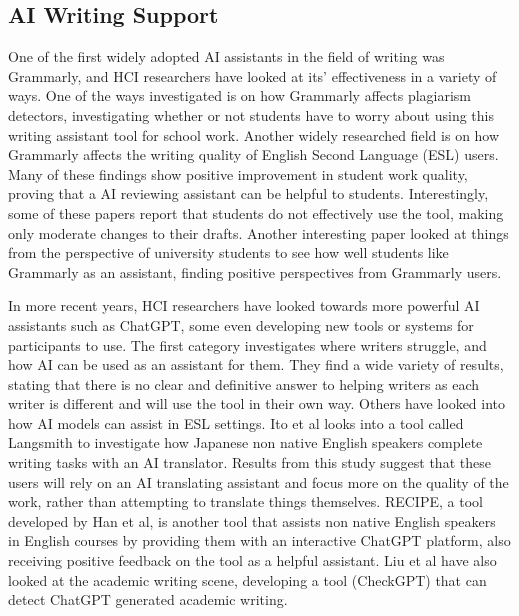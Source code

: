\documentclass[manuscript,screen,acmsmall]{acmart}
\begin{document}




\subsection{AI Writing Support}

    One of the first widely adopted AI assistants in the field of writing was Grammarly, and HCI researchers have looked at its' effectiveness in a variety of ways. One of the ways investigated is on how Grammarly affects plagiarism detectors, investigating whether or not students have to worry about using this writing assistant tool for school work. Another widely researched field is on how Grammarly affects the writing quality of English Second Language (ESL) users. Many of these findings show positive improvement in student work quality, proving that a AI reviewing assistant can be helpful to students. Interestingly, some of these papers report that students do not effectively use the tool, making only moderate changes to their drafts. Another interesting paper looked at things from the perspective of university students to see how well students like Grammarly as an assistant, finding positive perspectives from Grammarly users.

    In more recent years, HCI researchers have looked towards more powerful AI assistants such as ChatGPT, some even developing new tools or systems for participants to use. The first category investigates where writers struggle, and how AI can be used as an assistant for them. They find a wide variety of results, stating that there is no clear and definitive answer to helping writers as each writer is different and will use the tool in their own way. Others have looked into how AI models can assist in ESL settings. Ito et al looks into a tool called Langsmith to investigate how Japanese non native English speakers complete writing tasks with an AI translator. Results from this study suggest that these users will rely on an AI translating assistant and focus more on the quality of the work, rather than attempting to translate things themselves. RECIPE, a tool developed by Han et al, is another tool that assists non native English speakers in English courses by providing them with an interactive ChatGPT platform, also receiving positive feedback on the tool as a helpful assistant. Liu et al have also looked at the academic writing scene, developing a tool (CheckGPT) that can detect ChatGPT generated academic writing.
    
\end{document}
